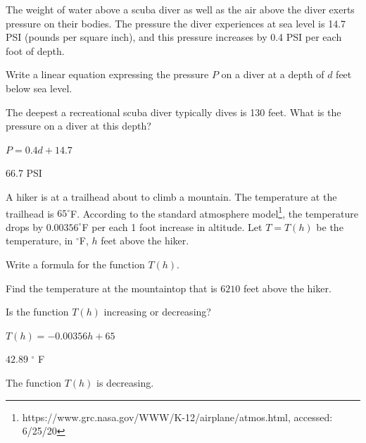 \begin{exercise}
    The weight of water above a scuba diver as well as the air above the diver exerts pressure on their bodies. The pressure the diver experiences at sea level is 14.7 PSI (pounds per square inch), and this pressure increases by 0.4 PSI per each foot of depth.

    \begin{parts}
        \item  Write a linear equation expressing the pressure $P$ on a diver at a depth of $d$ feet below sea level.

        \item The deepest a recreational scuba diver typically dives is 130 feet. What is the pressure on a diver at this depth?
    \end{parts}
\end{exercise}


\begin{solution}
    \begin{parts}
        \item $P=0.4d+14.7$
        \item 66.7 PSI
    \end{parts}
\end{solution}




\begin{exercise}
    A hiker is at a trailhead about to climb a mountain. The temperature at the trailhead is $65^{\circ}$F. According to the standard atmosphere model\footnote{https://www.grc.nasa.gov/WWW/K-12/airplane/atmos.html, accessed: 6/25/20}, the temperature drops by $0.00356^{\circ}$F per each 1 foot increase in altitude. Let $T=T(h)$  be the temperature, in $^{\circ}$F, $h$ feet above the hiker.

    \begin{parts}
        \item Write a formula for the function $T(h)$.

         \item Find the temperature at the mountaintop that is $6210$ feet above the hiker.

        \item Is the function $T(h)$ increasing or decreasing?
    \end{parts}

\end{exercise}

\begin{solution}
    \begin{parts}
        \item $T(h)=-0.00356h+65$
        \item $42.89$ $^\circ$ F
        \item The function $T(h)$ is decreasing.
    \end{parts}
\end{solution}




